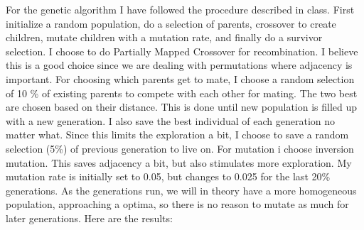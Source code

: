 \documentclass[a4paper, norsk, 12pt]{article}
\begin{document}
For the genetic algorithm I have followed the procedure described in class. First initialize a random population, do a selection of parents, crossover to create children, mutate children with a mutation rate, and finally do a survivor selection.
\newline\newline
I choose to do Partially Mapped Crossover for recombination. I believe this is a good choice since we are dealing with permutations where adjacency is important. For choosing which parents get to mate, I choose a random selection of 10 \% of existing parents to compete with each other for mating. The two best are chosen based on their distance. This is done until new population is filled up with a new generation. I also save the best individual of each generation no matter what. Since this limits the exploration a bit, I choose to save a random selection (5\%) of previous generation to live on. 
\newline\newline
For mutation i choose inversion mutation. This saves adjacency a bit, but also stimulates more exploration. My mutation rate is initially set to 0.05, but changes to 0.025 for the last 20\% generations. As the generations run, we will in theory have a more homogeneous population, approaching a optima, so there is no reason to mutate as much for later generations.
\newline\newline
Here are the results:
\end{document}
